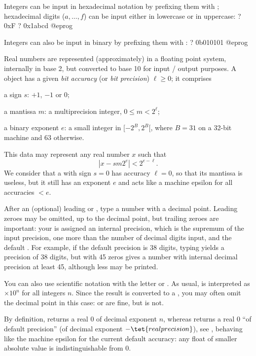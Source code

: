 Integers can be input in hexadecimal notation by prefixing them with
; hexadecimal digits ($a, \dots, f$) can be input either in lowercase
or in uppercase:
\bprog
? 0xF
? 0x1abcd
@eprog

Integers can also be input in binary by prefixing them with
:
\bprog
? 0b010101
@eprog

%

Real numbers are represented (approximately) in a floating point system,
internally in base 2, but converted to base 10 for input / output purposes.
A  object has a given \emph{bit accuracy} (or \emph{bit precision})
$\ell \geq 0$; it comprises

\item a sign $s$: $+1$, $-1$ or $0$;

\item a mantissa $m$: a multiprecision integer, $0\leq m < 2^\ell$;

\item a binary exponent $e$: a small integer in $[-2^B,2^B[$, where $B = 31$
on a 32-bit machine and 63 otherwise.

This data may represent any real number $x$ such that
$$|x - s m 2^e| < 2^{e-\ell}.$$
We consider that a  with sign $s = 0$ has accuracy $\ell = 0$, so
that its mantissa is useless, but it still has an exponent $e$ and acts like
a machine epsilon for all accuracies $< e$.

After an (optional) leading \kbd{+} or \kbd{-}, type a number with a decimal
point. Leading zeroes may be omitted, up to the decimal point, but trailing
zeroes are important: your  is assigned an internal precision,
which is the supremum of the input precision, one more than the number of
decimal digits input, and the default . For example, if
the default precision is 38 digits, typing  yields a precision of 38
digits, but  with 45 zeros gives a number with internal
decimal precision at least 45, although less may be printed.

You can also use scientific notation with the letter  or
. As usual,  is interpreted as $\times 10^n$ for all
integers $n$. Since the result is converted to a , you may often
omit the decimal point in this case:  or  are fine,
but  is not.

By definition,  returns a real $0$ of decimal exponent $n$, whereas
 returns a real 0 ``of default precision'' (of decimal exponent
$-\tet{realprecision}$), see , behaving like the machine
epsilon for the current default accuracy: any float of smaller absolute value
is indistinguishable from $0$.

